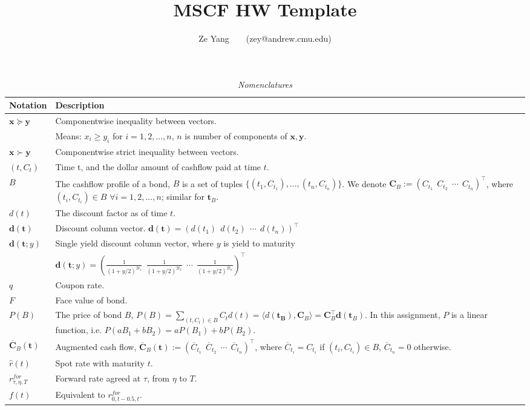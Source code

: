 \documentclass[a4paper, 10pt]{article}
\title{\textbf{MSCF HW Template}}
\author{Ze Yang~~~~(zey@andrew.cmu.edu)}
\renewcommand{\arraystretch}{1.3}
\theoremstyle{definition}
\theoremstyle{hSol}
\begin{document}
\maketitle

\begin{table}[h]
\vspace{-10pt}
\caption{\textit{Nomenclatures}}
\vspace{3pt}
\centering
\def\arraystretch{1.15}
\begin{tabular}{lL}
\hline
Notation & \hspace{4.6cm} Description \\ 
\hline
$\bm{x}\succeq \bm{y}$ & Componentwise inequality between vectors.\\
& Means: $x_i \geq y_i$ for $i=1,2,...,n$, $n$ is number of components of $\bm{x}, \bm{y}$.\\
$\bm{x}\succ \bm{y}$ & Componentwise strict inequality between vectors.\\
$(t, C_t)$ & Time t, and the dollar amount of cashflow paid at time $t$. \\
$B$ & The cashflow profile of a bond, $B$ is a set of tuples $\{(t_1, C_{t_1}), ..., (t_n, C_{t_n})\}$. We denote $\bm{C}_{B} := (C_{t_1}~~C_{t_2}~~\cdots~~C_{t_n})^{\top}$, where $(t_i, C_{t_i}) \in B$ $\forall i = 1,2,...,n$; similar for $\bm{t}_B$.\\
$d(t)$ & The discount factor as of time $t$.\\
$\bm{d}(\bm{t})$ & Discount column vector. $\bm{d}(\bm{t}) = (d(t_1) ~~ d(t_2) ~~\cdots~~ d(t_n))^{\top}$ \\
$\bm{d}(\bm{t}; y)$ & Single yield discount column vector, where $y$ is yield to maturity \\
& $\bm{d}(\bm{t}; y) = (\tfrac{1}{(1+y/2)^{2t_1}} ~~ \tfrac{1}{(1+y/2)^{2t_2}} ~~\cdots~~ \tfrac{1}{(1+y/2)^{2t_n}})^{\top}$ \\
$q$ & Coupon rate.\\
$F$ & Face value of bond.\\
$P(B)$ & The price of bond $B$, $P(B)=\sum_{(t,C_t) \in B}C_td(t)=\langle d(\bm{t_B}), \bm{C}_B \rangle = \bm{C}_B^{\top}\bm{d}(\bm{t}_B)$. In this assignment, $P$ is a linear function, i.e. $P(aB_1+bB_2) = aP(B_1)+bP(B_2).$\\
$\overline{\bm{C}}_{B}(\bm{t})$ & Augmented cash flow,  $\overline{\bm{C}}_{B}(\bm{t}) := (\overline{C}_{t_1}~~\overline{C}_{t_2}~~\cdots~~\overline{C}_{t_n})^{\top}$, where $\overline{C}_{t_i} = C_{t_i}$ if $(t_i, C_{t_i}) \in B$, $\overline{C}_{t_n}=0$ otherwise.\\
$\hat{r}(t)$ & Spot rate with maturity $t$.\\
$r^{for}_{\tau, \eta, T}$ & Forward rate agreed at $\tau$, from $\eta$ to $T$.\\
$f(t)$ & Equivalent to $r^{for}_{0, t-0.5, t}$. \\
\hline 
\end{tabular}
\label{tab:Nomen}
\end{table}
\end{document}
